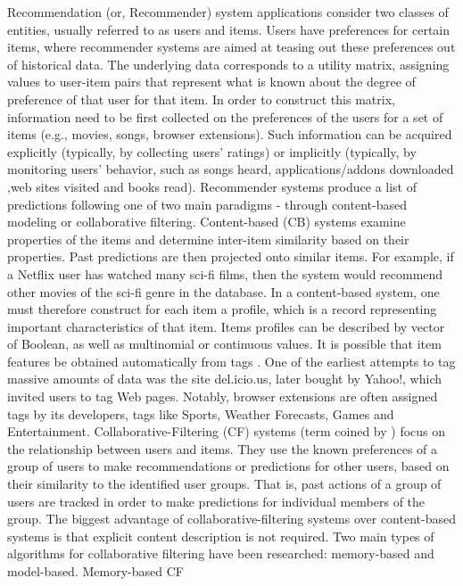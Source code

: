 \documentclass[11pt,oneside]{book}
\begin{document}
Recommendation (or, Recommender) system applications \citep{resnick1997recommender} consider two
classes of entities, usually referred to as users and items. Users
have preferences for certain items, where recommender systems are
aimed at teasing out these preferences out of historical data. The
underlying data corresponds to a utility matrix, assigning values to
user-item pairs that represent what is known about the degree of
preference of that user for that item. In order to construct this
matrix, information need to be first collected on the preferences of
the users for a set of items (e.g., movies, songs, browser
extensions). Such information can be acquired explicitly (typically,
by collecting users’ ratings) or implicitly (typically, by
monitoring users’ behavior, such as songs heard, applications/addons
downloaded ,web sites visited and books read).  Recommender systems
produce a list of predictions following one of two main paradigms -
through content-based modeling or collaborative
filtering. Content-based (CB) systems examine properties of the items
and determine inter-item similarity based on their properties. Past
predictions are then projected onto similar items. For example, if a
Netflix user has watched many sci-fi films, then the system would
recommend other movies of the sci-fi genre in the database. In a
content-based system, one must therefore construct for each item a
profile, which is a record representing important characteristics of
that item. Items profiles can be described by vector of Boolean, as
well as multinomial or continuous values. It is possible that item
features be obtained automatically from tags \citep{golder2006usage}. One of the earliest
attempts to tag massive amounts of data was the site del.icio.us,
later bought by Yahoo!, which invited users to tag Web pages. Notably,
browser extensions are often assigned tags by its developers, tags
like Sports, Weather Forecasts, Games and Entertainment.
Collaborative-Filtering (CF) systems (term coined by \citep{goldberg1992using}) focus on the relationship between users and items. They
use the known preferences of a group of users to make recommendations
or predictions for other users, based on their similarity to the
identified user groups. That is, past actions of a group of users are
tracked in order to make predictions for individual members of the
group. The biggest advantage of collaborative-filtering systems over
content-based systems is that explicit content description is not
required. Two main types of algorithms for collaborative filtering
have been researched: memory-based and model-based.  Memory-based CF
\end{document}
